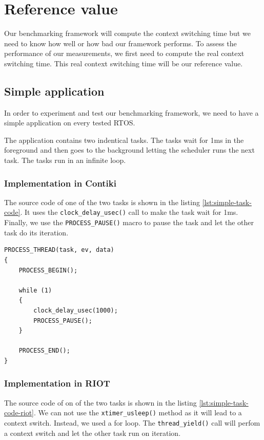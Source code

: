 \section{Reference value \label{sec:reference}}

Our benchmarking framework will compute the context switching time but we need to know how well or how bad our framework performs.
To assess the performance of our measurements, we first need to compute the real context switching time.
This real context switching time will be our reference value.

\subsection{Simple application}
In order to experiment and test our benchmarking framework, we need to have a simple application on every tested RTOS.

The application contains two indentical tasks.
The tasks wait for 1ms in the foreground and then goes to the background letting the scheduler runs the next task.
The tasks run in an infinite loop.

\subsubsection{Implementation in Contiki}
The source code of one of the two tasks is shown in the listing \ref{lst:simple-task-code}.
It uses the \texttt{clock\_delay\_usec()} call to make the task wait for 1ms.
Finally, we use the \texttt{PROCESS\_PAUSE()} macro to pause the task and let the other task do its iteration.

\begin{lstlisting}[style=CStyle, float, label={lst:simple-task-code}, caption={Source code of a task implemented in Contiki for the simple application}]
PROCESS_THREAD(task, ev, data)
{
    PROCESS_BEGIN();

    while (1)
    {
        clock_delay_usec(1000);
        PROCESS_PAUSE();
    }

    PROCESS_END();
}
\end{lstlisting}

\subsubsection{Implementation in RIOT}
The source code of on of the two tasks is shown in the listing \ref{lst:simple-task-code-riot}.
We can not use the \texttt{xtimer\_usleep()} method as it will lead to a context switch.
Instead, we used a for loop.
The \texttt{thread\_yield()} call will perfom a context switch and let the other task run on iteration.


